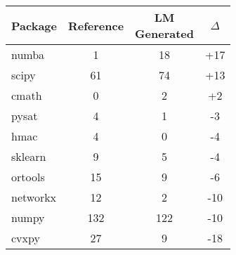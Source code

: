 \small
\begin{tabular}{lccc}
\toprule
Package & Reference &  \makecell{LM\\Generated} & $\Delta$ \\
\midrule
numba & 1 & 18 & +17 \\
scipy & 61 & 74 & +13 \\
cmath & 0 & 2 & +2 \\
pysat & 4 & 1 & -3 \\
hmac & 4 & 0 & -4 \\
sklearn & 9 & 5 & -4 \\
ortools & 15 & 9 & -6 \\
networkx & 12 & 2 & -10 \\
numpy & 132 & 122 & -10 \\
cvxpy & 27 & 9 & -18 \\
\bottomrule
\end{tabular}
